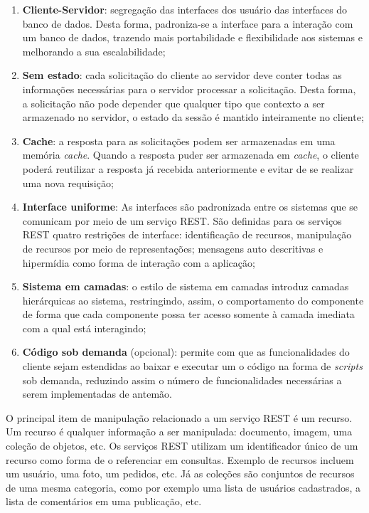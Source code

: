 \begin{enumerate}
	\item \textbf{Cliente-Servidor}:  segregação das interfaces dos usuário das interfaces do banco de dados. Desta forma, padroniza-se a interface para a interação com um banco de dados, trazendo mais portabilidade e flexibilidade aos sistemas e melhorando a sua escalabilidade;

	\item \textbf{Sem estado}: cada solicitação do cliente ao servidor deve conter todas as informações necessárias para o servidor processar a solicitação. Desta forma, a solicitação não pode depender que qualquer tipo que contexto a ser armazenado no servidor, o estado da sessão é mantido inteiramente no cliente;

	\item \textbf{Cache}:  a resposta para as solicitações podem ser armazenadas em uma memória \textit{cache}. Quando a resposta puder ser armazenada em \textit{cache}, o cliente poderá reutilizar a resposta já recebida anteriormente e evitar de se realizar uma nova requisição;

	\item \textbf{Interface uniforme}: As interfaces são padronizada entre os sistemas que se comunicam por meio de um serviço REST. São definidas para os serviços REST quatro restrições de interface: identificação de recursos, manipulação de recursos por meio de representações; mensagens auto descritivas e hipermídia como forma de interação com a aplicação;

	\item \textbf{Sistema em camadas}: o estilo de sistema em camadas introduz camadas hierárquicas  ao sistema, restringindo, assim, o comportamento do componente de forma que cada componente possa ter acesso somente à camada imediata com a qual está interagindo;

	\item \textbf{Código sob demanda} (opcional): permite com que as funcionalidades do cliente sejam estendidas ao baixar e executar um o código na forma de \textit{scripts} sob demanda, reduzindo assim o número de funcionalidades necessárias a serem implementadas de antemão.
\end{enumerate}

O principal item de manipulação relacionado a um serviço REST é um recurso. Um recurso é qualquer informação a ser manipulada: documento, imagem, uma coleção de objetos, etc. Os serviços REST utilizam um identificador único de um recurso como forma de o referenciar em consultas. Exemplo de recursos incluem um usuário, uma foto, um pedidos, etc. Já as coleções são conjuntos de recursos de uma mesma categoria, como por exemplo uma  lista de usuários cadastrados, a lista de comentários em uma publicação, etc.

